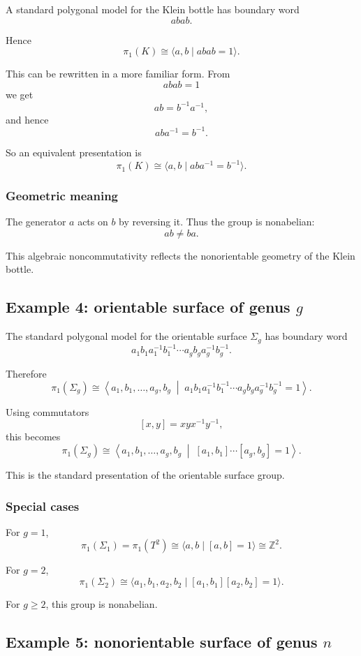 \documentclass[12pt,a4paper]{article}
\newcommand{\Z}{\mathbb{Z}}
\theoremstyle{notespace}
\begin{document}
A standard polygonal model for the Klein bottle has boundary word
\[
abab.
\]

Hence
\[
\pi_1(K)\cong \langle a,b\mid abab=1\rangle.
\]

This can be rewritten in a more familiar form. From
\[
abab=1
\]
we get
\[
ab=b^{-1}a^{-1},
\]
and hence
\[
aba^{-1}=b^{-1}.
\]

So an equivalent presentation is
\[
\pi_1(K)\cong \langle a,b\mid aba^{-1}=b^{-1}\rangle.
\]

\subsubsection*{Geometric meaning}

The generator \(a\) acts on \(b\) by reversing it. Thus the group is nonabelian:
\[
ab\neq ba.
\]

This algebraic noncommutativity reflects the nonorientable geometry of the Klein bottle.

\subsection{Example 4: orientable surface of genus \(g\)}

The standard polygonal model for the orientable surface \(\Sigma_g\) has boundary word
\[
a_1b_1a_1^{-1}b_1^{-1}\cdots a_gb_ga_g^{-1}b_g^{-1}.
\]

Therefore
\[
\pi_1(\Sigma_g)\cong
\left\langle
a_1,b_1,\dots,a_g,b_g
\;\middle|\;
a_1b_1a_1^{-1}b_1^{-1}\cdots a_gb_ga_g^{-1}b_g^{-1}=1
\right\rangle.
\]

Using commutators
\[
[x,y]=xyx^{-1}y^{-1},
\]
this becomes
\[
\pi_1(\Sigma_g)\cong
\left\langle
a_1,b_1,\dots,a_g,b_g
\;\middle|\;
[a_1,b_1]\cdots [a_g,b_g]=1
\right\rangle.
\]

This is the standard presentation of the orientable surface group.

\subsubsection*{Special cases}

For \(g=1\),
\[
\pi_1(\Sigma_1)=\pi_1(T^2)\cong \langle a,b\mid [a,b]=1\rangle \cong \Z^2.
\]

For \(g=2\),
\[
\pi_1(\Sigma_2)\cong
\langle a_1,b_1,a_2,b_2\mid [a_1,b_1][a_2,b_2]=1\rangle.
\]

For \(g\ge 2\), this group is nonabelian.

\subsection{Example 5: nonorientable surface of genus \(n\)}
\end{document}
